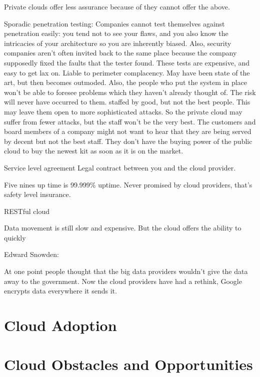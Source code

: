 \documentclass[11pt]{article}
\begin{document}
Private clouds offer less assurance because of they cannot offer the above.

Sporadic penetration testing: Companies cannot test themselves against penetration easily: you tend not to see your flaws, and you also know the intricacies of your architecture so you are inherently biased. Also, security companies aren’t often invited back to the same place because the company supposedly fixed the faults that the tester found. These tests are expensive, and easy to get lax on.
Liable to perimeter complacency. May have been state of the art, but then becomes outmoded. Also, the people who put the system in place won’t be able to foresee problems which they haven’t already thought of. The risk will never have occurred to them.
staffed by good, but not the best people. This may leave them open to more sophisticated attacks. So the private cloud may suffer from fewer attacks, but the staff won’t be the very best. The customers and board members of a company might not want to hear that they are being served by decent but not the best staff.
They don’t have the buying power of the public cloud to buy the newest kit as soon as it is on the market.

Service level agreement
Legal contract between you and the cloud provider.

Five nines up time is 99.999\% uptime. Never promised by cloud providers, that’s safety level insurance.

RESTful cloud

Data movement is still slow and expensive. But the cloud offers the ability to quickly 

Edward Snowden:

At one point people thought that the big data providers wouldn’t give the data away to the government. Now the cloud providers have had a rethink, Google encrypts data everywhere it sends it.



\section{Cloud Adoption}


\section{Cloud Obstacles and Opportunities}
\end{document}
